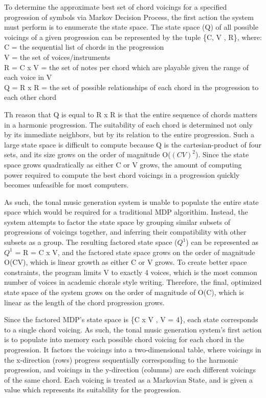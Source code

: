 \documentclass{chi2009}
\begin{document}
To determine the approximate best set of chord voicings for a specified progression of symbols via Markov Decision Process, the first action the system must perform is to enumerate the state space. The state space (Q) of all possible voicings of a given progression can be represented by the tuple \{C, V , R\}, where:
\\	C = the sequential list of chords in the progression
\\	V = the set of voices/instruments 
\\	R = C x V = the set of notes per chord which are 
	            playable given the range of each 
	            voice in V
\\	Q = R x R = the set of possible relationships of each 
             	chord in the progression to each other chord	
	
Th reason that Q is equal to R x R is that the entire sequence of chords matters in a harmonic progression.  The suitability of each chord is determined not only by its immediate neighbors, but by its relation to the entire progression.  Such a large state space is difficult to compute because Q is the cartesian-product of four sets, and its size grows on the order of magnitude O($(CV)^2$).  Since the state space grows quadratically as either C or V grows, the amount of computing power required to compute the best chord voicings in a progression quickly becomes unfeasible for most computers.

As such, the tonal music generation system is unable to populate the entire state space which would be required for a traditional MDP algorithim.  Instead, the system attempts to factor the state space by grouping similar subsets of progressions of voicings together, and inferring their compatibility with other subsets as a group.  The resulting factored state space ($Q^1$) can be represented as $Q^1$ = R = C x V, and the factored state space grows on the order of magnitude O(CV), which is linear growth as either C or V grows.  To create better space constraints, the program limits V to exactly 4 voices, which is the most common number of voices in academic chorale style writing.  Therefore, the final, optimized state space of the system grows on the order of magnitude of O(C), which is linear as the length of the chord progression grows.

Since the factored MDP's state space is \{C x V , V = 4\}, each state corresponds to a single chord voicing.  As such, the tonal music generation system's first action is to populate into memory each possible chord voicing for each chord in the progression.  It factors the voicings into a two-dimensional table, where voicings in the x-direction (rows) progress sequentially corresponding to the harmonic progression, and voicings in the y-direction (columns) are each different voicings of the same chord.  Each voicing is treated as a Markovian State, and is given a value which represents its suitability for the progression.   
\end{document}
